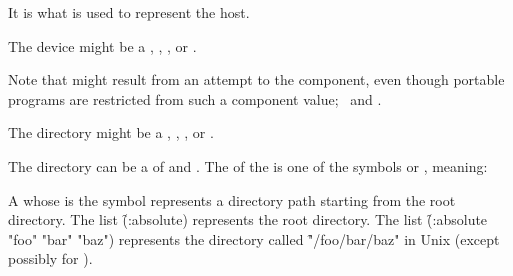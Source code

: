 It is  what  is used to represent the host. 

\endsubsubsubsection%


The device might be a ,
, , or \nil.

Note that  might result from an attempt to 
the  component, even though portable programs are restricted
from  such a component value; 
\seesection\WildcardRestrictions\ and \secref\ConstructingPathnames.

\endsubsubsubsection%


The directory might be a ,
%
, , or \nil.

The directory can be a  of  and . 
The  of the  is one of the symbols  or 
, meaning:

\beginlist

\item{}

  A  whose  is the symbol  represents 
  a directory path starting from the root directory.  The list 
  \f{(:absolute)} represents the root directory.  The list 
  \f{(:absolute "foo" "bar" "baz")} represents the directory called
  \f{"/foo/bar/baz"} in Unix (except possibly for ).
 
